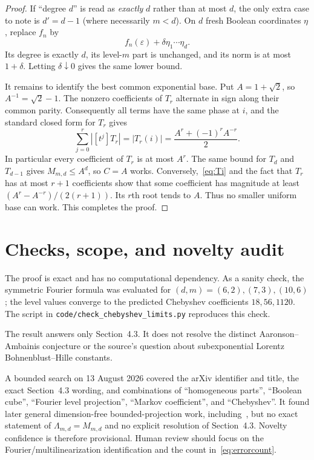 \documentclass[11pt]{article}
\begin{document}
\begin{proof}
If ``degree $d$'' is read as \emph{exactly} $d$ rather than at most $d$,
the only extra case to note is $d'=d-1$ (where necessarily $m<d$).  On $d$
fresh Boolean coordinates $\eta$, replace $f_n$ by
\[
 f_n(\varepsilon)+\delta\eta_1\cdots\eta_d.
\]
Its degree is exactly $d$, its level-$m$ part is unchanged, and its norm is at
most $1+\delta$.  Letting $\delta\downarrow0$ gives the same lower bound.

It remains to identify the best common exponential base.  Put
$A=1+\sqrt2$, so $A^{-1}=\sqrt2-1$.  The nonzero coefficients of $T_r$
alternate in sign along their common parity.  Consequently all terms have
the same phase at $i$, and the standard closed form for $T_r$ gives
\begin{equation}\label{eq:Ti}
 \sum_{j=0}^r|[t^j]T_r|
 =|T_r(i)|
 =\frac{A^r+(-1)^rA^{-r}}2.
\end{equation}
In particular every coefficient of $T_r$ is at most $A^r$.  The same bound
for $T_d$ and $T_{d-1}$ gives $M_{m,d}\le A^d$, so $C=A$ works.
Conversely,~\eqref{eq:Ti} and the fact that $T_r$ has at most $r+1$
coefficients show that some coefficient has magnitude at least
$(A^r-A^{-r})/(2(r+1))$.  Its $r$th root tends to $A$.  Thus no smaller
uniform base can work.  This completes the proof.
\end{proof}

\section{Checks, scope, and novelty audit}

The proof is exact and has no computational dependency.  As a sanity check,
the symmetric Fourier formula was evaluated for $(d,m)=(6,2),(7,3),(10,6)$;
the level values converge to the predicted Chebyshev coefficients
$18,56,1120$.  The script in \texttt{code/check\_chebyshev\_limits.py}
reproduces this check.

The result answers only Section~4.3.  It does not resolve the distinct
Aaronson--Ambainis conjecture or the source's question about subexponential
Lorentz Bohnenblust--Hille constants.

A bounded search on 13 August 2026 covered the arXiv identifier and title,
the exact Section~4.3 wording, and combinations of ``homogeneous parts'',
``Boolean cube'', ``Fourier level projection'', ``Markov coefficient'', and
``Chebyshev''.  It found later general dimension-free bounded-projection work,
including~\cite{BKSZ}, but no exact statement of
$\Lambda_{m,d}=M_{m,d}$ and no explicit resolution of Section~4.3.
Novelty confidence is therefore provisional.  Human review should focus on
the Fourier/multilinearization identification and the count
in~\eqref{eq:errorcount}.
\end{document}

